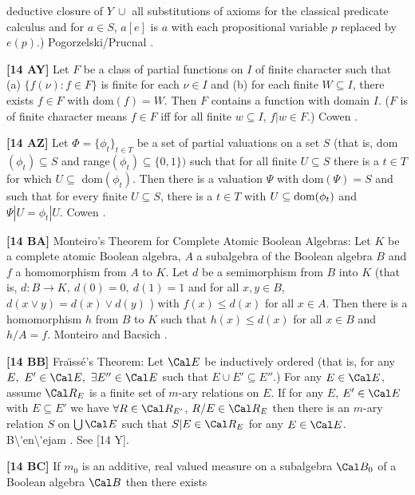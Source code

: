 deductive closure of $Y\ \cup$ all substitutions of axioms for the
classical predicate calculus and for $a\in S$, $a[e]$ is $a$ with each
propositional variable $p$ replaced by $e(p)$.)  \ac{Pogorzelski/Prucnal}
\cite{1974}.
\smallskip
\item{}{\bf [14 AY]} Let $F$ be a class of partial functions on $I$ of
finite character such that (a) $\{f(\nu): f\in F\}$ is finite for each
$\nu\in I$ and (b) for each finite $W\subseteq I$, there exists $f\in F$
with dom$(f) = W$. Then $F$ contains a function with domain $I$. ($F$ is
of finite character means $f\in F$ iff for all finite $w\subseteq I$,
$f|w\in F$.)  \ac{Cowen} \cite{1973}.
\smallskip
\item{}{\bf [14 AZ]}  Let $\Phi  = \{\phi_{t}\}_{t\in T}$ be a set of
partial valuations on a set $S$ (that is, dom$(\phi_{t})\subseteq S$ and
range$(\phi_{t})\subseteq \{0,1\})$ such  that for all finite
$U\subseteq S$ there is a $t\in T$ for which $U \subseteq$ dom$(\phi_{t})$.
Then there is a valuation $\Psi$ with dom$(\Psi) = S$ and such that for
every finite $U\subseteq S$, there is a $t\in T$ with $U\subseteq
\hbox{dom}(\phi_{t})$ and $\Psi|U = \phi_{t}| U$.  \ac{Cowen} \cite{1973}.
\smallskip
\item{}{\bf [14 BA]} Monteiro's Theorem for Complete Atomic Boolean
Algebras:  Let $K$ be a complete atomic Boolean algebra,
$A$ a subalgebra of the Boolean algebra $B$ and $f$ a homomorphism from
$A$ to $K$.  Let $d$ be a semimorphism from $B$ into $K$ (that is, $d :
B \to K,\ d(0) = 0,\ d(1) = 1$ and for all $x, y\in B$, $d(x \lor
y) = d(x) \lor d(y)$ ) with $f(x) \le d(x)$ for all $x \in A$.  Then
there is a homomorphism $h$ from $B$ to $K$ such that $h(x) \le d(x)$
for all $x \in B$ and $h/A = f$.  \ac{Monteiro} \cite{1965} and \ac{Bacsich}
\cite{1972a}. 
\smallskip
\item{}{\bf [14 BB]} Fra\"\i ss\'e's Theorem:  Let $\Cal E$ be inductively
ordered (that is, for any $E,\ E'\in\Cal E,\ \exists E''\in\Cal E$
such that $E\cup E'\subseteq E''$.) For any $E\in\Cal E$, assume
$\Cal R_E$ is a finite set of $m$-ary relations on $E$.  If for any $E$,
$E'\in\Cal E$ with $E\subseteq E'$ we have $\forall R\in\Cal R_{E'}$,
$R/E \in \Cal R_E$ then there is an $m$-ary relation $S$ on
$\bigcup\Cal E$ such that $S|E \in\Cal R_E$ for any $E\in\Cal E$.
\ac{B\'en\'ejam} \cite{1970}. See [14 Y]. 
\smallskip
\item{}{\bf [14 BC]}  If $m_0$ is an additive, real valued measure on a
subalgebra $\Cal B_0$ of a Boolean algebra $\Cal B$ then there exists
